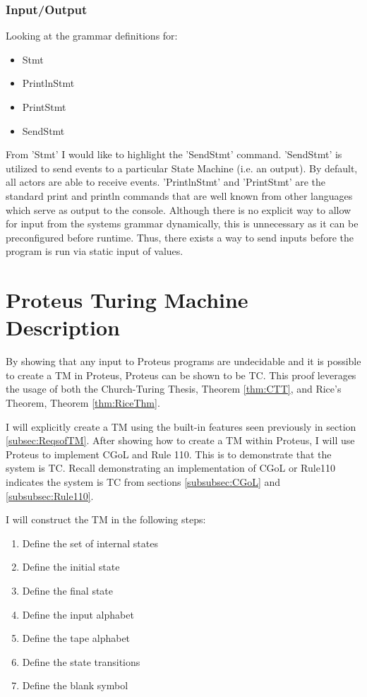 \subsubsection{Input/Output}\label{subsubsec:IO}

Looking at the grammar definitions for:
\begin{itemize}
    \item Stmt
    \item PrintlnStmt
    \item PrintStmt
    \item SendStmt
\end{itemize}

From 'Stmt' I would like to highlight the 'SendStmt' command.
'SendStmt' is utilized to send events to a particular State Machine (i.e. an output).
By default, all actors are able to receive events.
'PrintlnStmt' and 'PrintStmt' are the standard print and println commands that are well known from other languages which serve as output to the console.
Although there is no explicit way to allow for input from the systems grammar dynamically, this is unnecessary as it can be preconfigured before runtime.
Thus, there exists a way to send inputs before the program is run via static input of values.

\section{Proteus Turing Machine Description}\label{sec:ProteusTMDescr}

By showing that any input to Proteus programs are undecidable and it is possible to create a TM in Proteus, Proteus can be shown to be TC.
This proof leverages the usage of both the Church-Turing Thesis, Theorem \ref{thm:CTT}, and Rice's Theorem, Theorem \ref{thm:RiceThm}.

I will explicitly create a TM using the built-in features seen previously in section \ref{subsec:ReqsofTM}.
After showing how to create a TM within Proteus, I will use Proteus to implement CGoL and Rule 110.
This is to demonstrate that the system is TC.
Recall demonstrating an implementation of CGoL or Rule110 indicates the system is TC from sections \ref{subsubsec:CGoL} and \ref{subsubsec:Rule110}.

I will construct the TM in the following steps:

\begin{enumerate}
    \item Define the set of internal states
    \item Define the initial state
    \item Define the final state
    \item Define the input alphabet
    \item Define the tape alphabet
    \item Define the state transitions
    \item Define the blank symbol
\end{enumerate}

